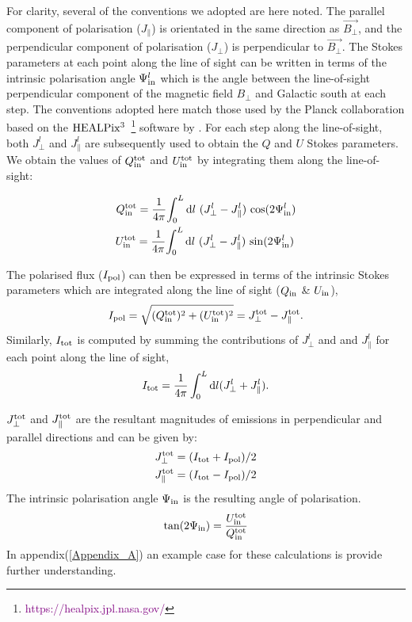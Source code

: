 \documentclass[usenatbib]{mnras}
\newcommand{\Vasu}[1]{{\color{purple}#1}}
\begin{document}
For clarity, several of the conventions we adopted are here noted. The parallel component of polarisation (${J_{\parallel}}$) is orientated in the same direction as  $\vec{B_{\perp}}$, and the perpendicular component of polarisation (${J_{\perp}}$) is perpendicular to $\vec{B_{\perp}}$. The Stokes parameters at each point along the line of sight can be written in terms of the intrinsic polarisation angle $\Psi^l_{\rm in}$ which is the angle between the line-of-sight perpendicular component of the magnetic field $B_{\perp}$ and Galactic south at each step. The conventions adopted here match those used by the Planck collaboration \cite{Planck_XIX} based on the $\rm HEALPix^3$~\footnote{\textcolor{purple}{https://healpix.jpl.nasa.gov/}} software by \cite{Healpix_2005}. For each step along the line-of-sight, both  ${J_{\perp}^l}$ and ${J_{\parallel}^l}$ are subsequently used to obtain the $Q$ and $U$ Stokes parameters. We obtain the values of $Q^{\rm tot}_{\rm in}$ and $U^{\rm tot}_{\rm in}$ by integrating them along the line-of-sight:

\begin{eqnarray}
Q_{\rm in}^{\rm tot} = \frac{1}{4\pi} {\int_0^L \mathrm{d}l \ ({J_{\perp}^l} - J_{\parallel}^l) \ {\cos}(2\Psi^l_{\rm in}) } \\
U_{\rm in}^{\rm tot} =\frac{1}{4\pi} {\int_0^L \mathrm{d}l \ ({J_{\perp}^l} - J_{\parallel}^l) \ {\sin}(2\Psi^l_{\rm in})} \,
\end{eqnarray}

The polarised flux ($I_{\rm pol}$) can then be expressed in terms of the intrinsic Stokes parameters which are integrated along the line of sight (${Q_{\rm in}}$ \& ${U_{\rm in}}$),
\begin{eqnarray} \label{eq_I_pol}
I_{\rm pol} = \sqrt{(Q_{\rm in}^{\rm tot})^2+(U_{\rm in}^{\rm tot})^2} = J_{\perp}^{\rm tot} - J_{\parallel}^{\rm tot}.
\end{eqnarray}
Similarly, $I_{\rm tot}$ is computed by summing the contributions of $J_{\perp}^l$ and and $J_{\parallel}^l$ for each point along the line of sight,
\begin{equation} \label{eq_I_tot}
    I_{\rm tot} = \frac{1}{4\pi} \int_0^L \mathrm{d}l (J_{\perp}^l + J_{\parallel}^l).
\end{equation}

$J_{\perp}^{\rm tot}$ and $J_{\parallel}^{\rm tot}$ are the resultant magnitudes of emissions in perpendicular and parallel directions and can be given by:
\begin{eqnarray}
J_{\perp}^{\rm tot} = (I_{\rm tot} + I_{\rm pol})/2 \\
J_{\parallel}^{\rm tot} = (I_{\rm tot} - I_{\rm pol})/2 
\end{eqnarray}
The intrinsic polarisation angle $\Psi_{\rm in}$ is the resulting angle of polarisation.
\begin{eqnarray}
\tan(2\Psi_{\rm in}) = \frac{U_{\rm in}^{\rm tot}}{Q_{\rm in}^{\rm tot}} 
\end{eqnarray}
In appendix(\ref{Appendix_A}) an example case for these calculations is provide further understanding.
\end{document}
